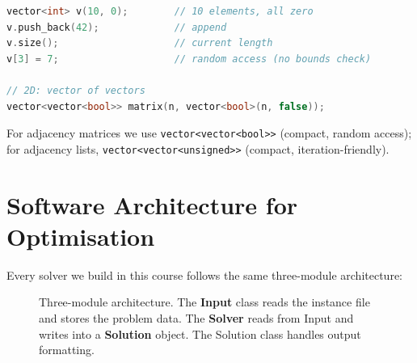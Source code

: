 \begin{lstlisting}[language=C++, caption={Common \texttt{vector}
  operations.}]
vector<int> v(10, 0);        // 10 elements, all zero
v.push_back(42);             // append
v.size();                    // current length
v[3] = 7;                    // random access (no bounds check)

// 2D: vector of vectors
vector<vector<bool>> matrix(n, vector<bool>(n, false));
\end{lstlisting}

\noindent
For adjacency matrices we use
\texttt{vector<vector<bool>{}>} (compact, random access);
for adjacency lists, \texttt{vector<vector<unsigned>{}>}
(compact, iteration-friendly).


\section{Software Architecture for Optimisation}
\label{sec:solver-architecture}

Every solver we build in this course follows the same three-module
architecture:%

\begin{figure}[H]
\centering
{}
\caption{Three-module architecture.  The \textbf{Input} class
         reads the instance file and stores the problem data.
         The \textbf{Solver} reads from Input and writes into
         a \textbf{Solution} object.  The Solution class handles
         output formatting.}
\label{fig:three-module}
\end{figure}

